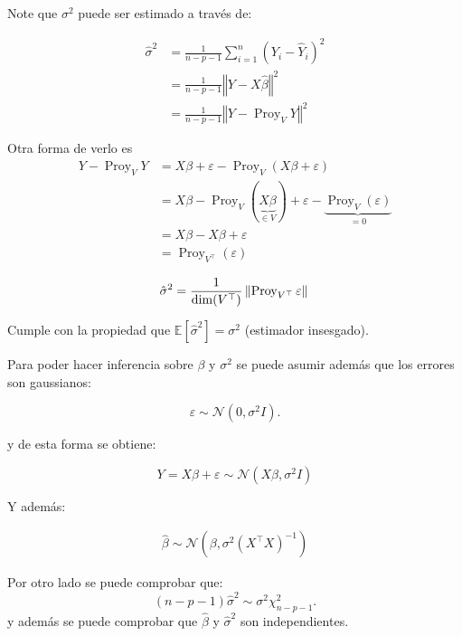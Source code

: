 \documentclass[
  12pt,
]{book}
\theoremstyle{definition}
\theoremstyle{definition}
\theoremstyle{definition}
\theoremstyle{definition}
\theoremstyle{remark}
\begin{document}
Note que \(\sigma^{2}\) puede ser estimado a través de:

\begin{align*}
 \hat{\sigma}^{2} 
 &=  \frac{1}{n-p-1} \sum_{i=1}^{n} \left( Y_{i} - \hat{Y}_{i}\right)^{2} \\
 &= \frac{1}{n-p-1}\left\Vert Y - X\hat{\beta} \right\Vert^{2} \\
 &=   \frac{1}{n-p-1} \left\Vert Y-\operatorname{Proy}_{V}Y \right\Vert^{2} 
 \end{align*}

Otra forma de verlo es
\begin{align*}
Y-\operatorname{Proy}_{V}Y  
&= X\beta + \varepsilon -  \operatorname{Proy}_{V}( X\beta + \varepsilon) \\
&= X\beta - \operatorname{Proy}_{V}( \underbrace{X\beta}_{\in V}) + \varepsilon - \underbrace{\operatorname{Proy}_{V}( \varepsilon)}_{=0} \\
&= X\beta -X\beta + \varepsilon \\
&=  \operatorname{Proy}_{V^{\top}}( \varepsilon)
 \end{align*}

\begin{equation*}
\hat{\sigma}^{2} 
= \frac{1}{\operatorname{dim}(V^{\top})}\left\Vert \operatorname{Proy}_{V^{\top}}\varepsilon\right\Vert \\
\end{equation*}

Cumple con la propiedad que \(\mathbb{E}\left[\hat{\sigma}^{2}\right] = \sigma^{2}\) (estimador insesgado).

Para poder hacer inferencia sobre \(\beta\) y \(\sigma^2\) se puede asumir además que los errores son gaussianos:

\begin{equation*}
\varepsilon\sim \mathcal{N}\left(0,\sigma^{2}I\right).
\end{equation*}

y de esta forma se obtiene:

\begin{equation*}
Y = X\beta + \varepsilon \sim \mathcal{N}\left(X\beta,\sigma^{2}I\right)
\end{equation*}

Y además:

\begin{align*}
\hat{\beta} \sim  \mathcal{N}\left(\beta,\sigma^2 (X^{\top}X)^{-1}\right) 
\end{align*}

Por otro lado se puede comprobar que:
\[(n-p-1)\hat{\sigma}^{2} \sim \sigma^{2} \chi^{2}_{n-p-1}.\]
y además se puede comprobar que \(\hat \beta\) y \(\hat \sigma^2\) son independientes.
\end{document}
